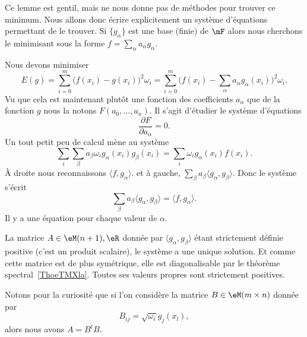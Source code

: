 \begin{normaltext}
    Ce lemme est gentil, mais ne nous donne pas de méthodes pour trouver ce minimum. Nous allons donc écrire explicitement un système d'équations permettant de le trouver. Si \( \{ g_{\alpha} \} \) est une base (finie) de \( \mF\) alors nous cherchons le minimisant sous la forme \( f=\sum_{\alpha}a_{\alpha}g_{\alpha}\).

    Nous devons minimiser
    \begin{equation}
        E(g)=\sum_{i=0}^m\big( f(x_i)-g(x_i) \big)^2\omega_i=\sum_{i=0}^m\big( f(x_i)-\sum_{\alpha}a_{\alpha}g_{\alpha}(x_i) \big)^2\omega_i.
    \end{equation}
    Vu que cela est maintenant plutôt une fonction des coefficients \( a_{\alpha}\) que de la fonction \( g\) nous la notons \( F(a_0,\ldots, a_n)\). Il s'agit d'étudier le système d'équations
    \begin{equation}
        \frac{ \partial F }{ \partial a_{\alpha} }=0.
    \end{equation}
    Un tout petit peu de calcul mène au système
    \begin{equation}
        \sum_i\sum_{\beta}a_{\beta}\omega_ig_{\alpha}(x_i)g_{\beta}(x_i)=\sum_{i}\omega_ig_{\alpha}(x_i)f(x_i).
    \end{equation}
    À droite nous reconnaissons \( \langle f, g_{\alpha}\rangle \). et à gauche, \( \sum_{\beta}a_{\beta}\langle g_{\alpha}, g_{\beta}\rangle \). Donc le système s'écrit
    \begin{equation}
        \sum_{\beta}a_{\beta}\langle g_{\alpha}, g_{\beta}\rangle =\langle f, g_{\alpha}\rangle .
    \end{equation}
    Il y a une équation pour chaque valeur de \( \alpha\).

    La matrice \( A\in\eM(n+1),\eR\) donnée par  \( \langle g_{\alpha}, g_{\beta}\rangle \) étant strictement définie positive (c'est un produit scalaire), le système a une unique solution. Et comme cette matrice est de plus symétrique, elle est diagonalisable par le théorème spectral~\ref{ThoeTMXla}. Toutes ses valeurs propres sont strictement positives.

    Notons pour la curiosité que si l'on considère la matrice \( B\in\eM(m\times n)\) donnée par
    \begin{equation}
        B_{ij}=\sqrt{ \omega_i }g_j(x_l),
    \end{equation}
    alors nous avons \( A=B^tB\).
\end{normaltext}


